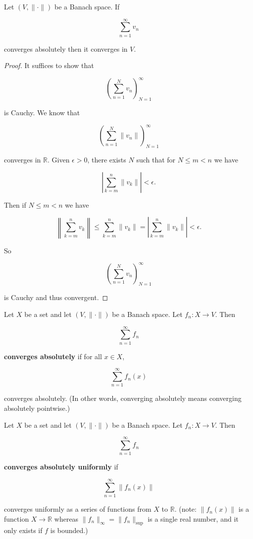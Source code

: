 \begin{proposition}

Let \((V, \lVert \cdot \rVert)\) be a Banach space. If 


\[
\sum_{n=1}^\infty v_n
\]

converges absolutely then it converges in \(V\).

\end{proposition}

\begin{proof}

It suffices to show that 

\[
\left( \sum_{n=1}^N v_n \right)_{N=1}^\infty
\]

is Cauchy. We know that 

\[
\left( \sum_{n=1}^N \lVert v_n \rVert \right)_{N=1}^\infty
\]

converges in \(\mathbb{R}\). Given \(\epsilon > 0\), there exists \(N\) such that for \(N \leq m < n\) we have

\[
\left| \sum_{k=m}^n \lVert v_k \rVert \right| < \epsilon.
\]

Then if \(N \leq m  < n\) we have

\[
\left\lVert \sum_{k=m}^n  v_k  \right\rVert \leq \sum_{k=m}^n \lVert v_k \rVert = \left| \sum_{k=m}^n \lVert v_k \rVert \right|  < \epsilon.
\]

So 

\[
\left( \sum_{n=1}^N v_n \right)_{N=1}^\infty
\]

is Cauchy and thus convergent.

\end{proof}

\begin{definition}

Let \(X\) be a set and let \((V, \lVert \cdot \rVert)\) be a Banach space. Let \(f_n: X \to V\). Then

\[
\sum_{n=1}^\infty f_n 
\]

\textbf{converges absolutely} if for all \(x \in X\),

\[
\sum_{n=1}^\infty f_n (x)
\]

converges absolutely. (In other words, converging absolutely means converging absolutely pointwise.)

\end{definition}



\begin{definition}

Let \(X\) be a set and let \((V, \lVert \cdot \rVert)\) be a Banach space. Let \(f_n: X \to V\). Then

\[
\sum_{n=1}^\infty f_n 
\]

\textbf{converges absolutely uniformly} if 

\[
\sum_{n=1}^\infty \lVert  f_n (x) \rVert
\]

converges uniformly as a series of functions from \(X\) to \(\mathbb{R}\). (note: \( \lVert  f_n (x) \rVert\) is a function \(X \to \mathbb{R}\) whereas \(\lVert f_n \rVert_\infty = \lVert f_n \rVert_{\text{sup}}\) is a single real number, and it only exists if \(f\) is bounded.)

\end{definition}

